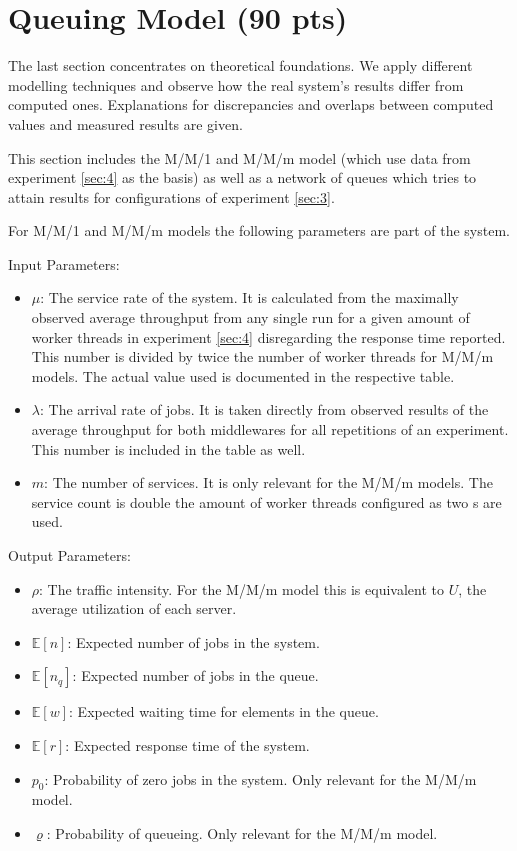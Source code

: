 \section{Queuing Model (90 pts)\label{sec:7}}

    The last section concentrates on theoretical foundations. We apply different modelling techniques and observe how
    the real system's results differ from computed ones. Explanations for discrepancies and overlaps between computed
    values and measured results are given.

    This section includes the M/M/1 and M/M/m model (which use data from experiment \ref{sec:4} as the basis) as well as
    a network of queues which tries to attain results for configurations of experiment \ref{sec:3}.

    For M/M/1 and M/M/m models the following parameters are part of the system.

    Input Parameters:
    \begin{itemize}
        \item $\mu$: The service rate of the system. It is calculated from the maximally observed average throughput
              from any single run for a given amount of worker threads in experiment \ref{sec:4} disregarding the
              response time reported. This number is divided by twice the number of worker threads for M/M/m models. The
              actual value used is documented in the respective table.
        \item $\lambda$: The arrival rate of jobs. It is taken directly from observed results of the average throughput
              for both middlewares for all repetitions of an experiment. This number is included in the table as well.
        \item $m$: The number of services. It is only relevant for the M/M/m models. The service count is double the
              amount of worker threads configured as two \mw{}s are used.
    \end{itemize}

    Output Parameters:
    \begin{itemize}
        \item $\rho$: The traffic intensity. For the M/M/m model this is equivalent to $U$, the average utilization of
              each server.
        \item $\mathbb{E}[n]$: Expected number of jobs in the system.
        \item $\mathbb{E}[n_q]$: Expected number of jobs in the queue.
        \item $\mathbb{E}[w]$: Expected waiting time for elements in the queue.
        \item $\mathbb{E}[r]$: Expected response time of the system.
        \item $p_0$: Probability of zero jobs in the system. Only relevant for the M/M/m model.
        \item $\varrho$: Probability of queueing. Only relevant for the M/M/m model.
    \end{itemize}

